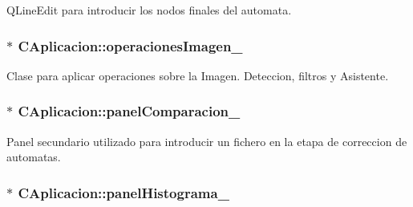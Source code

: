 Q\+Line\+Edit para introducir los nodos finales del automata. 

\subsubsection[{\texorpdfstring{operaciones\+Imagen\+\_\+}{operacionesImagen_}}]{$\ast$ C\+Aplicacion\+::operaciones\+Imagen\+\_\+\hspace{0.3cm}{\ttfamily [private]}}\hypertarget{classCAplicacion_a58596bdd1d1e018bcb8bd58b64de538e}{}\label{classCAplicacion_a58596bdd1d1e018bcb8bd58b64de538e}


Clase para aplicar operaciones sobre la Imagen. Deteccion, filtros y Asistente. 

\subsubsection[{\texorpdfstring{panel\+Comparacion\+\_\+}{panelComparacion_}}]{$\ast$ C\+Aplicacion\+::panel\+Comparacion\+\_\+\hspace{0.3cm}{\ttfamily [private]}}\hypertarget{classCAplicacion_a16f1c9d4fd9168f0787c210588a048be}{}\label{classCAplicacion_a16f1c9d4fd9168f0787c210588a048be}


Panel secundario utilizado para introducir un fichero en la etapa de correccion de automatas. 

\subsubsection[{\texorpdfstring{panel\+Histograma\+\_\+}{panelHistograma_}}]{$\ast$ C\+Aplicacion\+::panel\+Histograma\+\_\+\hspace{0.3cm}{\ttfamily [private]}}\hypertarget{classCAplicacion_a5edbe0644420ff42d80a2a5d247c69eb}{}\label{classCAplicacion_a5edbe0644420ff42d80a2a5d247c69eb}


